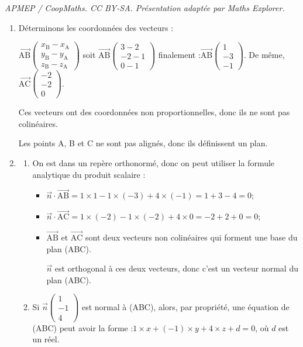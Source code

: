 \documentclass[10pt]{article}
\providecommand{\vect}[1]{\overrightarrow{#1}}
\providecommand{\vectt}[1]{\overrightarrow{\mathrm{#1}}}
\begin{document}
\noindent\textit{APMEP / CoopMaths. CC BY-SA. Présentation adaptée par Maths Explorer.}\par\medskip
\begin{enumerate}
	\item Déterminons les coordonnées des vecteurs :

	$\vectt{AB} \begin{pmatrix}
		x_{\mathrm{B}} - x_{\mathrm{A}}\\
		y_{\mathrm{B}} - y_{\mathrm{A}}\\
		z_{\mathrm{B}} - z_{\mathrm{A}} \end{pmatrix} $
	\quad soit \quad $\vectt{AB} \begin{pmatrix} 3-2\\-2-1\\0-1 \end{pmatrix} $
	\quad finalement :\quad $\vectt{AB} \begin{pmatrix} 1\\-3\\-1\end{pmatrix} $.
	\quad De même, \quad $\vectt{AC} \begin{pmatrix} -2\\-2\\0 \end{pmatrix} $.

	Ces vecteurs ont des coordonnées non proportionnelles, donc ils ne sont pas colinéaires.

	Les points A, B et C ne sont pas alignés, donc ils définissent un plan.

	\item \begin{enumerate}
		\item On est dans un repère orthonormé, donc on peut utiliser la formule analytique du produit scalaire :

		\begin{itemize}
			\item $\vect{n} \cdot \vectt{AB} = 1 \times 1 -  1 \times  (-3) + 4  \times  (-1) = 1 + 3 - 4 = 0$;
			\item $\vect{n} \cdot \vectt{AC} = 1 \times (-2) -  1 \times  (-2) + 4  \times  0 = -2 + 2 + 0 = 0$;
			\item $\vectt{AB}$ et $\vectt{AC}$ sont deux vecteurs non colinéaires qui forment une base du plan (ABC).

			$\vect{n}$ est orthogonal à ces deux vecteurs, donc c'est un vecteur normal du plan (ABC).
		\end{itemize}
		\item Si $\vect{n}\begin{pmatrix} 1\\-1\\4 \end{pmatrix}$ est normal à (ABC), alors, par propriété, une équation de (ABC) peut avoir la forme :\quad $1\times x + (-1) \times y + 4 \times z + d = 0$, \quad où $d$ est un réel.


\end{enumerate}
\end{enumerate}
\end{document}
